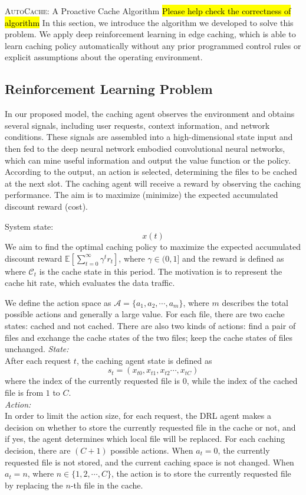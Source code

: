 \documentclass{article}
\begin{document}
\begin{section}{\textsc{AutoCache}: A Proactive Cache Algorithm}
    \label{algorithm}
    \hl{Please help check the correctness of algorithm}
    In this section, we introduce the algorithm we developed to solve this problem.
    We apply deep reinforcement learning in edge caching, which is able to learn caching policy automatically without any prior programmed control rules or explicit assumptions about the operating environment.

    \subsection{Reinforcement Learning Problem}
    In our proposed model, the caching agent observes the environment and obtains several signals, including user requests, context information, and network conditions. These signals are assembled into a high-dimensional state input and then fed to the deep neural network embodied convolutional neural networks, which can mine useful information and output the value function or the policy. According to the output, an action is selected, determining the files to be cached at the next slot. The caching agent will receive a reward by observing the caching performance. The aim is to maximize (minimize) the expected accumulated discount reward (cost).

    System state:
    $$
    x(t)
    $$
    We aim to find the optimal caching policy to maximize the expected accumulated discount reward $\mathbb{E}\left[\sum_{t=0}^{\infty}\gamma^tr_t\right]$, where $\gamma\in(0,1]$ and the reward is defined as where $\mathcal{C}_t$ is the cache state in this period. The motivation is to represent the cache hit rate, which evaluates the data traffic.

    We define the action space as $\mathcal{A}=\{a_1,a_2,\cdots,a_m\}$, where $m$ describes the total possible actions and generally a large value. For each file, there are two cache states: cached and not cached. There are also two kinds of actions: find a pair of files and exchange the cache states of the two files; keep the cache states of files unchanged.
    \emph{State:}\\
    After each request $t$, the caching agent state is defined as
    $$
        s_t=\left(x_{t0},x_{t1},x_{t2}\cdots,x_{tC}\right)
    $$
    where the index of the currently requested file is $0$, while the index of the cached file is from $1$ to $C$.\\
    \emph{Action:}\\
    In order to limit the action size, for each request, the DRL agent makes a decision on whether to store the currently requested file in the cache or not, and if yes, the agent determines which local file will be replaced. For each caching decision, there are $(C+1)$ possible actions. When $a_t=0$, the currently requested file is not stored, and the current caching space is not changed. When $a_t=n$, where $n\in\{1,2,\cdots,C\}$, the action is to store the currently requested file by replacing the $n$-th file in the cache.


\end{section}
\end{document}
